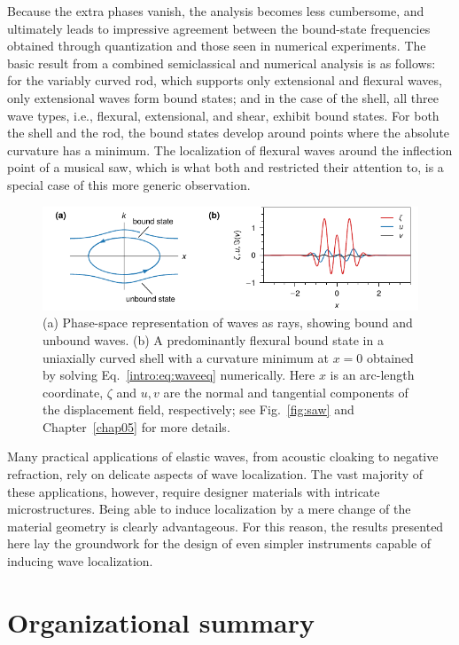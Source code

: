 Because the extra phases vanish, the analysis becomes less cumbersome, and ultimately leads to impressive agreement between the bound-state frequencies obtained through quantization and those seen in numerical experiments.
The basic result from a combined semiclassical and numerical analysis is as follows: for the variably curved rod, which supports only extensional and flexural waves, only extensional waves form bound states; and in the case of the shell, all three wave types, i.e., flexural, extensional, and shear, exhibit bound states.
For both the shell and the rod, the bound states develop around points where the absolute curvature has a minimum.
The localization of flexural waves around the inflection point of a musical saw, which is what both \citet{scott1992} and \citet{shankar2022} restricted their attention to, is a special case of this more generic observation.
%
\begin{figure}
  \begin{center}
    \includegraphics{figures/intro/phasespace.pdf}
  \end{center}
  \caption{(a) Phase-space representation of waves as rays, showing bound and unbound waves. (b) A predominantly flexural bound state in a uniaxially curved shell with a curvature minimum at $x = 0$ obtained by solving Eq.~\eqref{intro:eq:waveeq} numerically.
  Here $x$ is an arc-length coordinate, $\zeta$ and $u, v$ are the normal and tangential components of the displacement field, respectively; see Fig.~\ref{fig:saw} and Chapter~\ref{chap05} for more details.}
  \label{fig:phasespace}
\end{figure}
%
Many practical applications of elastic waves, from acoustic cloaking to negative refraction, rely on delicate aspects of wave localization.
The vast majority of these applications, however, require designer materials with intricate microstructures.
Being able to induce localization by a mere change of the material geometry is clearly advantageous.
For this reason, the results presented here lay the groundwork for the design of even simpler instruments capable of inducing wave localization.

\section{Organizational summary}

